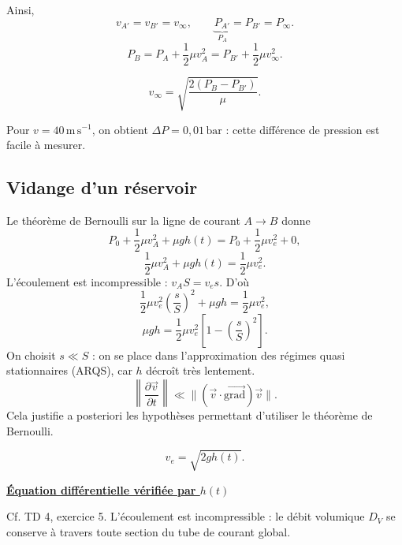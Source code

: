 \documentclass[11pt,a4paper]{article}
\newcommand{\grad}{\overrightarrow{\mathrm{grad}}}
\newcommand{\pd}[2]{\frac{\partial #1}{\partial #2}}
\newcommand{\titr}[1]{\par\textbf{\underline{#1}}\par\nopagebreak[3]}
\newcommand{\conv}{(\vec v\cdot\grad)\vec v}
\begin{document}
Ainsi,
\[v_{A'}=v_{B'}=v_\infty,\qquad\underbrace{P_{A'}}_{P_A}=P_{B'}=P_\infty.\]
\[P_B=P_A+\frac12\mu v_A^2=P_{B'}+\frac12\mu v_\infty^2.\]
\begin{cadre}\[v_\infty=\sqrt{\frac{2(P_B-P_{B'})}\mu}.\]\end{cadre}
Pour $v=40\,\mathrm{m\,s^{-1}}$, on obtient $\Delta P=0{,}01\,\mathrm{bar}$ : cette différence de pression est facile à mesurer.
\subsection{Vidange d'un réservoir}
\begin{center}\end{center}
Le théorème de Bernoulli sur la ligne de courant $A\to B$ donne
\[P_0+\frac12\mu v_A^2+\mu gh(t)=P_0+\frac12\mu v_e^2+0,\]
\[\frac12\mu v_A^2+\mu gh(t)=\frac12\mu v_e^2.\]
L'écoulement est incompressible : $v_AS=v_es$. D'où
\[\frac12\mu v_e^2\left(\frac sS\right)^2+\mu gh=\frac12\mu v_e^2,\]
\[\mu gh=\frac12\mu v_e^2\left[1-\left(\frac sS\right)^2\right].\]
On choisit $s\ll S$ : on se place dans l'approximation des régimes quasi stationnaires (ARQS), car $h$ décroît très lentement.
\[\left\|\pd{\vec v}t\right\|\ll\|\conv\|.\]
Cela justifie a posteriori les hypothèses permettant d'utiliser le théorème de Bernoulli.
\begin{cadre}\[v_e=\sqrt{2gh(t)}.\]\end{cadre}
\titr{Équation différentielle vérifiée par $h(t)$}
Cf. TD 4, exercice 5.
L'écoulement est incompressible : le débit volumique $D_V$ se conserve à travers toute section du tube de courant global.
\end{document}
